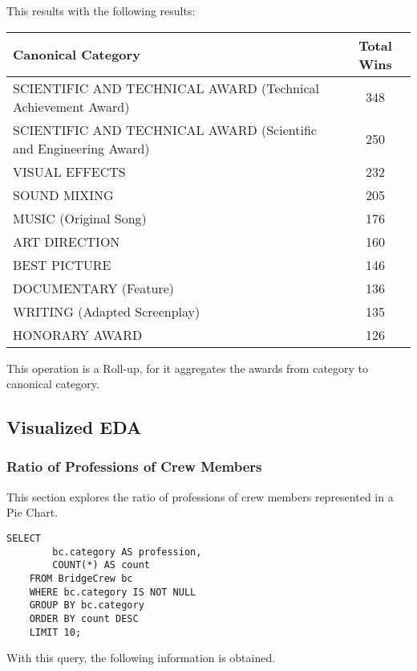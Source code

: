 This results with the following results:

\begin{center}
	\begin{tabular}{|p{5cm}|c|}
		\hline
		\textbf{Canonical Category} & \textbf{Total Wins} \\
		\hline
		SCIENTIFIC AND TECHNICAL AWARD (Technical Achievement Award) & 348 \\
		SCIENTIFIC AND TECHNICAL AWARD (Scientific and Engineering Award) & 250 \\
		VISUAL EFFECTS & 232 \\
		SOUND MIXING & 205 \\
		MUSIC (Original Song) & 176 \\
		ART DIRECTION & 160 \\
		BEST PICTURE & 146 \\
		DOCUMENTARY (Feature) & 136 \\
		WRITING (Adapted Screenplay) & 135 \\
		HONORARY AWARD & 126 \\
		\hline
	\end{tabular}
\end{center}

This operation is a Roll-up, for it aggregates the awards from category to canonical category.

\subsection{Visualized EDA}

\subsubsection{Ratio of Professions of Crew Members}

This section explores the ratio of professions of crew members represented in a Pie Chart.
\newline
\begin{lstlisting}[style=SQLStyle]
	SELECT 
		bc.category AS profession,
		COUNT(*) AS count
	FROM BridgeCrew bc
	WHERE bc.category IS NOT NULL
	GROUP BY bc.category
	ORDER BY count DESC
	LIMIT 10;
\end{lstlisting}

With this query, the following information is obtained.

